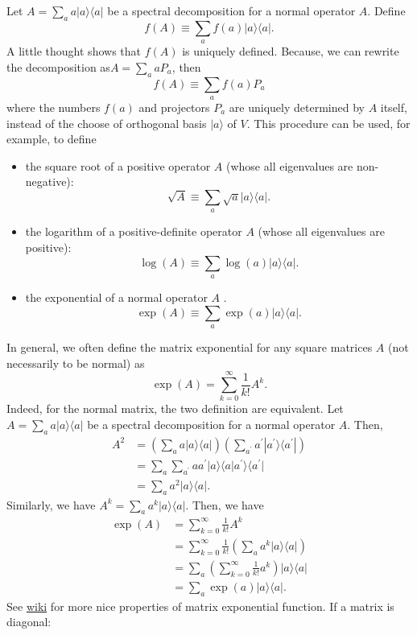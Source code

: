 Let $A=\sum_{a} a|a\rangle\langle a|$ be a spectral decomposition for a normal operator $A$. Define 
$$
f(A) \equiv \sum_{a} f(a)|a\rangle\langle a|.
$$
A little thought shows that $f(A)$ is uniquely defined. Because, we can rewrite the decomposition as$A=\sum_{a} a P_{a}$, then 
$$
f(A) \equiv \sum_{a} f(a) P_{a}
$$
where the numbers $f(a)$ and projectors $P_{a}$ are uniquely determined by $A$ itself, instead of the choose of orthogonal basis $|a\rangle$ of $V.$ This procedure can be used, for example, to define 
\begin{itemize}
    \item the square root of a positive operator $A$ (whose all eigenvalues are non-negative):
$$
\sqrt{A} \equiv \sum_{a} \sqrt{a} |a\rangle\langle a|.
$$
    \item the logarithm of a positive-definite operator $A$ (whose all eigenvalues are positive):
$$
\log (A) \equiv \sum_{a} \log (a)|a\rangle\langle a|.
$$
    \item the exponential of a normal operator $A$ . 
$$
\exp (A) \equiv \sum_{a} \exp (a)|a\rangle\langle a|.
$$
\end{itemize}
In general, we often define the matrix exponential for any square matrices $A$ (not necessarily to be normal) as
$$
\exp (A) =\sum_{k=0}^{\infty} \frac{1}{k!} A^k.
$$
Indeed, for the normal matrix, the two definition are equivalent. Let $A=\sum_{a} a|a\rangle\langle a|$ be a spectral decomposition for a normal operator $A$. Then,
\begin{align}
    A^2
    &=\left(  \sum_{a} a|a\rangle\langle a| \right)\left(  \sum_{a^{\prime}} a^{\prime}|a^{\prime}\rangle\langle a^{\prime}| \right) \\
    &= \sum_{a}  \sum_{a^{\prime}}  a a^{\prime}|a\rangle\langle a|a^{\prime}\rangle\langle a^{\prime}| \\
    &=\sum_{a} a^2|a\rangle\langle a|.
\end{align}
Similarly, we have $A^k=\sum_{a} a^k|a\rangle\langle a|$. Then, we have
\begin{align}
\exp (A) 
&=\sum_{k=0}^{\infty} \frac{1}{k!} A^k \\
&=\sum_{k=0}^{\infty} \frac{1}{k!}  \left(\sum_{a} a^k|a\rangle\langle a|\right)\\
&=\sum_{a} \left( \sum_{k=0}^{\infty} \frac{1}{k!}  a^k \right)|a\rangle\langle a|\\
&=\sum_{a} \exp (a)|a\rangle\langle a|.
\end{align}
See \href{https://en.wikipedia.org/wiki/Matrix_exponential}{wiki} for more nice properties of matrix exponential function. If a matrix is diagonal:
